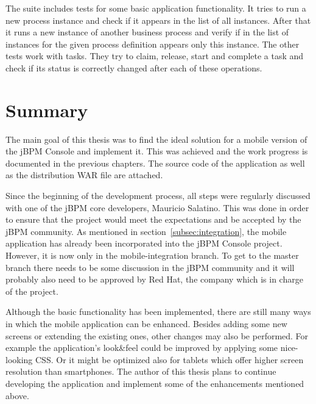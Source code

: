 \documentclass[12pt,oneside,final]{fithesis2}
\begin{document}
The suite includes tests for some basic application functionality.
It tries to run a new process instance and check if it appears in the list of all instances.
After that it runs a new instance of another business process and verify if in the list of instances for the given process definition appears only this instance.
The other tests work with tasks.
They try to claim, release, start and complete a task and check if its status is correctly changed after each of these operations.

\chapter{Summary}
The main goal of this thesis was to find the ideal solution for a mobile version of the jBPM Console and implement it.
This was achieved and the work progress is documented in the previous chapters.
The source code of the application as well as the distribution WAR file are attached.

Since the beginning of the development process, all steps were regularly discussed with one of the jBPM core developers, Mauricio Salatino.
This was done in order to ensure that the project would meet the expectations and be accepted by the jBPM community.
As mentioned in section~\ref{subsec:integration}, the mobile application has already been incorporated into the jBPM Console project.
However, it is now only in the mobile-integration branch.
To get to the master branch there needs to be some discussion in the jBPM community and it will probably also need to be approved by Red Hat, the company which is in charge of the project.

Although the basic functionality has been implemented, there are still many ways in which the mobile application can be enhanced.
Besides adding some new screens or extending the existing ones, other changes may also be performed.
For example the application's look\&feel could be improved by applying some nice-looking CSS.
Or it might be optimized also for tablets which offer higher screen resolution than smartphones.
The author of this thesis plans to continue developing the application and implement some of the enhancements mentioned above.

\printbibliography
\end{document}
